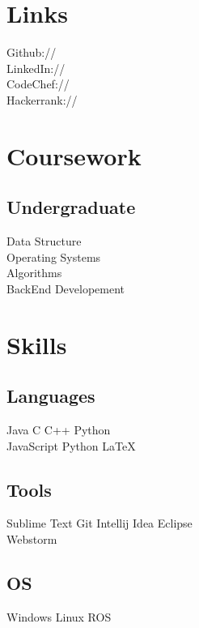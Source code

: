 \documentclass[]{resume-openfont}
\begin{document}
\begin{minipage}[t]{0.33\textwidth}
\section{Links} 
Github:// \href{https://github.com/Abheet099}{} \\
LinkedIn://  \href{https://www.linkedin.com/in/abheet-verma-44854910a/}{} \\
CodeChef://  \href{https://codechef.com/users/coder099}{} \\
Hackerrank://  \href{https://www.hackerrank.com/abheetverma099}{}
\sectionsep


\section{Coursework}

\subsection{Undergraduate}
Data Structure\\
Operating Systems \\
Algorithms \\
BackEnd Developement \\
\sectionsep


\section{Skills}
\subsection{Languages}
Java \textbullet{}   C \textbullet{} C++ \textbullet{} Python \\
JavaScript \textbullet{} Python \textbullet{} \LaTeX\ \\ 
\subsection{Tools}
Sublime Text \textbullet{} Git \textbullet{} Intellij Idea \textbullet{} Eclipse  \\
Webstorm
\subsection{OS}
Windows \textbullet{} Linux \textbullet{} ROS

\end{minipage}
\end{document}
